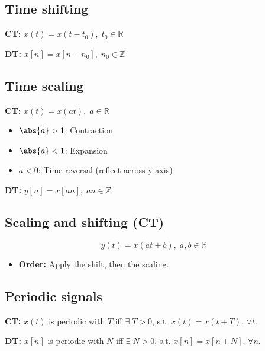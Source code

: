 \subsection{Time shifting}
\begin{definition}
    
    \textbf{CT:} $x(t) = x(t-t_0), \; t_0 \in \mathbb{R}$
    \vspace{1em}

    \textbf{DT:} $x[n] = x[n-n_0], \; n_0 \in \mathbb{Z}$

\end{definition}

\subsection{Time scaling}
\begin{definition}
    
    \textbf{CT:} $x(t) = x(at), \; a\in \mathbb{R}$
    \begin{itemize}
        \item $\abs{a} > 1$: Contraction
        \item $\abs{a} < 1$: Expansion
        \item $a < 0$: Time reversal (reflect across y-axis)
    \end{itemize}
    \vspace{1em}

    \textbf{DT:} $y[n] = x[an], \; an\in \mathbb{Z}$
\end{definition}

\subsection{Scaling and shifting (CT)}
\begin{definition}
    \begin{equation}
        y(t) = x(at+b), \; a,b\in \mathbb{R}
    \end{equation}
    \begin{itemize}
        \item \textbf{Order:} Apply the shift, then the scaling.
    \end{itemize}
\end{definition}

\subsection{Periodic signals}
\begin{definition}
    
    \textbf{CT:} $x(t)$ is periodic with $T$ iff $\exists \; T>0$, s.t. $x(t)=x(t+T)$, $\forall t$. 
    \vspace{1em}

    \textbf{DT:} $x[n]$ is periodic with $N$ iff $\exists \; N>0$, s.t. $x[n]=x[n+N]$, $\forall n$. 
\end{definition}

